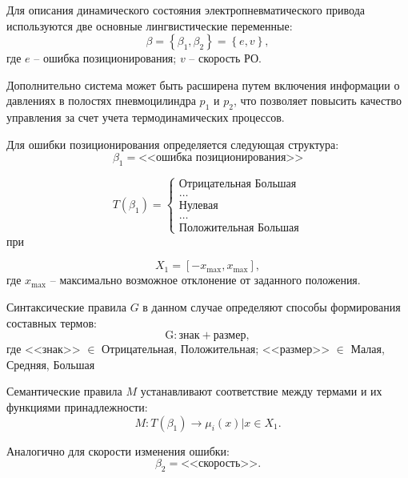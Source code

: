 Для описания динамического состояния электропневматического привода
используются две основные лингвистические переменные:
\begin{equation*}
\beta = \left\{\beta_1, \beta_2\right\} = \left\{e, v\right\},
\end{equation*}
где $e$ -- ошибка позиционирования;
$v$ -- скорость РО.

Дополнительно система может быть расширена путем включения информации о
давлениях в полостях пневмоцилиндра $p_1$ и $p_2$, что позволяет повысить
качество управления за счет учета термодинамических процессов.

Для ошибки позиционирования определяется следующая структура:
\begin{equation*}
\beta_1 = \text{<<ошибка позиционирования>>}
\end{equation*}

\begin{equation*}
T(\beta_1) =\begin{cases}
	\text{Отрицательная Большая} \\
	\ldots \\
	\text{Нулевая} \\
	\ldots \\
	\text{Положительная Большая}
\end{cases} 
\end{equation*}
при

\begin{equation*}
X_1 = [-x_{\text{max}}, x_{\text{max}}],
\end{equation*}
где $x_{\text{max}}$ -- максимально возможное отклонение от заданного положения.

Синтаксические правила $G$ в данном случае определяют способы формирования составных термов:
\begin{equation*}
\text{G}: \text{знак} + \text{размер},
\end{equation*}
где <<знак>> $\in$ {Отрицательная, Положительная}; <<размер>> $\in$ {Малая, Средняя, Большая}

Семантические правила $M$ устанавливают соответствие между термами и их функциями принадлежности:
\begin{equation*}
M: T(\beta_1) \rightarrow {\mu_i(x) | x \in X_1}.
\end{equation*}

Аналогично для скорости изменения ошибки:
\begin{equation*}
\beta_2 = \text{<<скорость>>}.
\end{equation*}

